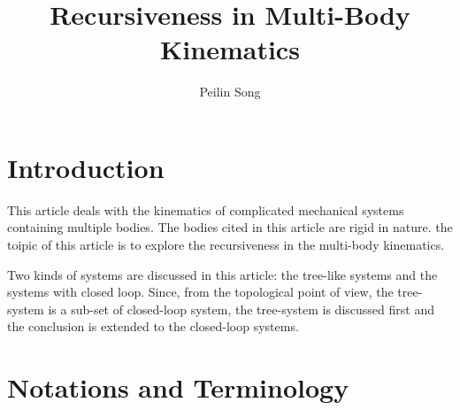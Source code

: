 \documentclass{article}
\author{Peilin Song}
\title{Recursiveness in Multi-Body Kinematics}
\begin{document}
\maketitle
\tableofcontents

\section{Introduction}

This article deals with the kinematics of complicated mechanical systems containing multiple bodies. The bodies cited in this article are rigid in nature. the toipic of this article is to explore the recursiveness in the multi-body kinematics.

Two kinds of systems are discussed in this article: the tree-like systems and the systems with closed loop. Since, from the topological point of view, the 
tree-system is a sub-set of closed-loop system, the tree-system is discussed first and the conclusion is extended to the closed-loop systems.

  
\section{Notations and Terminology}
\end{document}
